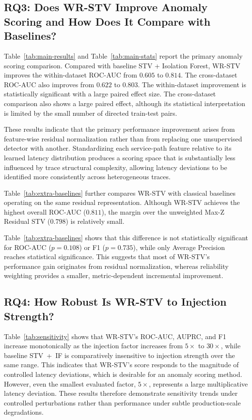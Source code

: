 \subsection{RQ3: Does WR-STV Improve Anomaly Scoring and How Does It Compare with Baselines?}
\label{sec:results-main}



Table~\ref{tab:main-results} and Table~\ref{tab:main-stats} report the
primary anomaly scoring comparison. Compared with baseline STV +
Isolation Forest, WR-STV improves the within-dataset ROC-AUC from
\(0.605\) to \(0.814\). The cross-dataset ROC-AUC also improves from
\(0.622\) to \(0.803\). The within-dataset improvement is statistically
significant with a large paired effect size. The cross-dataset
comparison also shows a large paired effect, although its statistical
interpretation is limited by the small number of directed train-test
pairs.

These results indicate that the primary performance improvement arises
from feature-wise residual normalization rather than from replacing one
unsupervised detector with another. Standardizing each service-path
feature relative to its learned latency distribution produces a scoring
space that is substantially less influenced by trace structural
complexity, allowing latency deviations to be identified more
consistently across heterogeneous traces.


Table~\ref{tab:extra-baselines} further compares WR-STV with classical
baselines operating on the same residual representation. Although WR-STV
achieves the highest overall ROC-AUC (\(0.811\)), the margin over the
unweighted Max-Z Residual STV (\(0.798\)) is relatively small.

Table~\ref{tab:extra-baselines} shows that this difference is not
statistically significant for ROC-AUC (\(p=0.108\)) or F1
(\(p=0.735\)), while only Average Precision reaches statistical
significance. This suggests that most of WR-STV's performance gain
originates from residual normalization, whereas reliability weighting
provides a smaller, metric-dependent incremental improvement.

\subsection{RQ4: How Robust Is WR-STV to Injection Strength?}
\label{sec:results-sensitivity}

Table~\ref{tab:sensitivity} shows that WR-STV's ROC-AUC, AUPRC, and F1
increase monotonically as the injection factor increases from
\(5\times\) to \(30\times\), while baseline STV~+~IF is comparatively
insensitive to injection strength over the same range. This indicates
that WR-STV's score responds to the magnitude of controlled latency
deviations, which is desirable for an anomaly scoring method. However,
even the smallest evaluated factor, \(5\times\), represents a large
multiplicative latency deviation. These results therefore demonstrate
sensitivity trends under controlled perturbations rather than
performance under subtle production-scale degradations.

